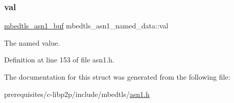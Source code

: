 \subsubsection{\texorpdfstring{val}{val}}
{\footnotesize\ttfamily \mbox{\hyperlink{structmbedtls__asn1__buf}{mbedtls\+\_\+asn1\+\_\+buf}} mbedtls\+\_\+asn1\+\_\+named\+\_\+data\+::val}

The named value. 

Definition at line 153 of file asn1.\+h.



The documentation for this struct was generated from the following file\+:\begin{DoxyCompactItemize}
\item 
prerequisites/c-\/libp2p/include/mbedtls/\mbox{\hyperlink{asn1_8h}{asn1.\+h}}\end{DoxyCompactItemize}
